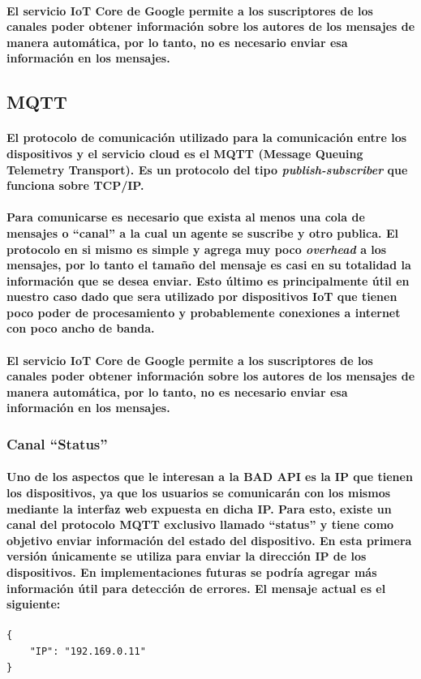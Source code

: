\documentclass{article}
\begin{document}
\paragraph{
El servicio IoT Core de Google permite a los suscriptores de los canales poder obtener información sobre los autores de los mensajes de manera automática, por lo tanto, no es necesario enviar esa información en los mensajes.
}

\subsection{MQTT}
\paragraph{
El protocolo de comunicación utilizado para la comunicación entre los dispositivos y el servicio cloud es el MQTT (Message Queuing Telemetry Transport). Es un protocolo del tipo \textit{publish-subscriber} que funciona sobre TCP/IP.
}
\paragraph{
Para comunicarse es necesario que exista al menos una cola de mensajes o ``canal'' a la cual un agente se suscribe y otro publica. El protocolo en si mismo es simple y agrega muy poco \textit{overhead} a los mensajes, por lo tanto el tamaño del mensaje es casi en su totalidad la información que se desea enviar. Esto último es principalmente útil en nuestro caso dado que sera utilizado por dispositivos IoT que tienen poco poder de procesamiento y probablemente conexiones a internet con poco ancho de banda.
}
\paragraph{
El servicio IoT Core de Google permite a los suscriptores de los canales poder obtener información sobre los autores de los mensajes de manera automática, por lo tanto, no es necesario enviar esa información en los mensajes.
}

\subsubsection{Canal “Status”}
\paragraph{
Uno de los aspectos que le interesan a la BAD API es la IP que tienen los dispositivos, ya que los usuarios se comunicarán con los mismos mediante la interfaz web expuesta en dicha IP. Para esto, existe un canal del protocolo MQTT exclusivo llamado “status” y tiene como objetivo enviar información del estado del dispositivo. En esta primera versión únicamente se utiliza para enviar la dirección IP de los dispositivos. En implementaciones futuras se podría agregar más información útil para detección de errores. El mensaje actual es el siguiente:
}
\begin{verbatim}
{
    "IP": "192.169.0.11"
}
\end{verbatim}
\end{document}
